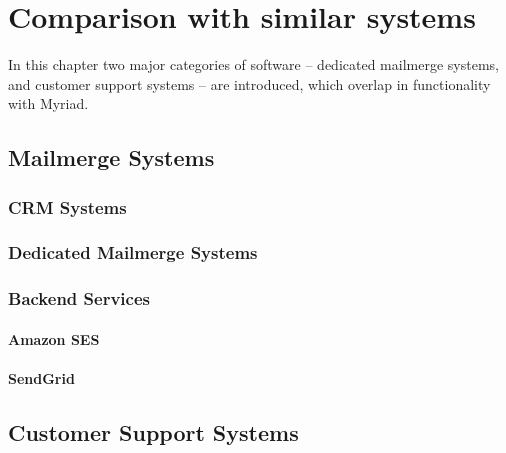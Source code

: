 \chapter{Comparison with similar systems}
\label{chapter:Comparison}

In this chapter two major categories of software -- dedicated mailmerge systems, and customer support systems -- are introduced, which overlap in functionality with Myriad.

\section{Mailmerge Systems}
\label{section:MailmergeSystems}

\subsection{CRM Systems}

\subsection{Dedicated Mailmerge Systems}

\subsection{Backend Services}

\subsubsection{Amazon SES}
\subsubsection{SendGrid}


\section{Customer Support Systems}
